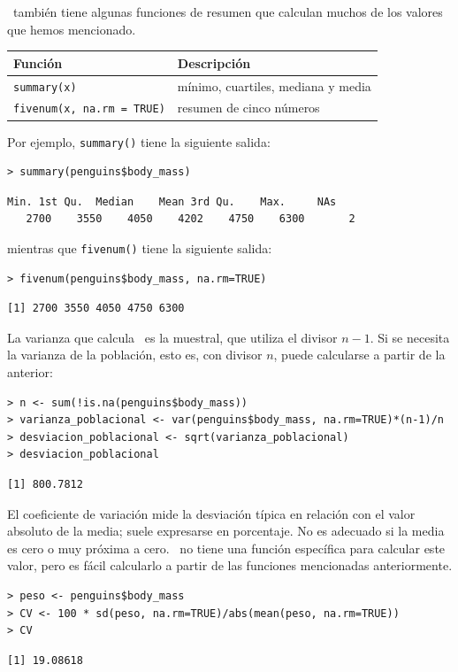 \documentclass[11pt,a4paper]{article}
\newcommand{\R}{\textcolor{azuluc}{\faIcon{r-project}}}
\theoremstyle{exercise}
\begin{document}
\R\ también tiene algunas funciones de resumen que calculan muchos de los valores que hemos mencionado.

\begin{center}
	\begin{tabular}{|l|l|} \hline
		\textbf{Función} & \textbf{Descripción} \\ \hline	
		\texttt{summary(x)}                & mínimo, cuartiles, mediana y media \\
		\texttt{fivenum(x, na.rm = TRUE)}  & resumen de cinco números \\ \hline
	\end{tabular}
\end{center}


Por ejemplo, \texttt{summary()} tiene la siguiente salida:
\begin{lstlisting}[style=rconsole]
> summary(penguins$body_mass)
\end{lstlisting}
\begin{lstlisting}[style=routput]
   Min. 1st Qu.  Median    Mean 3rd Qu.    Max.     NAs 
   2700    3550    4050    4202    4750    6300       2 
\end{lstlisting}
mientras que \texttt{fivenum()} tiene la siguiente salida:
\begin{lstlisting}[style=rconsole]
> fivenum(penguins$body_mass, na.rm=TRUE)
\end{lstlisting}
\begin{lstlisting}[style=routput]
[1] 2700 3550 4050 4750 6300
\end{lstlisting}




La varianza que calcula \R\ es la muestral, que utiliza el divisor \(n-1\). Si se necesita la varianza de la población, esto es, con divisor \(n\), puede calcularse a partir de la anterior:
\begin{lstlisting}[style=rconsole]
> n <- sum(!is.na(penguins$body_mass))
> varianza_poblacional <- var(penguins$body_mass, na.rm=TRUE)*(n-1)/n
> desviacion_poblacional <- sqrt(varianza_poblacional)
> desviacion_poblacional
\end{lstlisting}
\begin{lstlisting}[style=routput]
[1] 800.7812
\end{lstlisting}

El coeficiente de variación mide la desviación típica en relación con el valor absoluto de la media; suele expresarse en porcentaje. No es adecuado si la media es cero o muy próxima a cero. \R\ no tiene una función específica para calcular este valor, pero es fácil calcularlo a partir de las funciones mencionadas anteriormente.
\begin{lstlisting}[style=rconsole]
> peso <- penguins$body_mass
> CV <- 100 * sd(peso, na.rm=TRUE)/abs(mean(peso, na.rm=TRUE))
> CV
\end{lstlisting}
\begin{lstlisting}[style=routput]
[1] 19.08618
\end{lstlisting}
\end{document}
